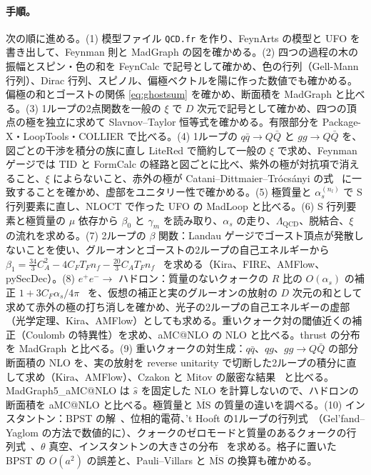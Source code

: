 \documentclass[a4paper,10pt]{ltjsarticle}
\newcommand{\MSbar}{\overline{\mathrm{MS}}}
\begin{document}
\paragraph{手順。}次の順に進める。(1) 模型ファイル \texttt{QCD.fr} を作り、FeynArts の模型と UFO を書き出して、Feynman 則と MadGraph の図を確かめる。(2) 四つの過程の木の振幅とスピン・色の和を FeynCalc で記号として確かめ、色の行列（Gell-Mann 行列）、Dirac 行列、スピノル、偏極ベクトルを陽に作った数値でも確かめる。偏極の和とゴーストの関係 \eqref{eq:ghostsum} を確かめ、断面積を MadGraph と比べる。(3) 1ループの2点関数を一般の $\xi$ で $D$ 次元で記号として確かめ、四つの頂点の極を独立に求めて Slavnov--Taylor 恒等式を確かめる。有限部分を Package-X・LoopTools・COLLIER で比べる。(4) 1ループの $q\bar q\to Q\bar Q$ と $gg\to Q\bar Q$ を、図ごとの干渉を積分の族に直し LiteRed で簡約して一般の $\xi$ で求め、Feynman ゲージでは TID と FormCalc の経路と図ごとに比べ、紫外の極が対抗項で消えること、$\xi$ によらないこと、赤外の極が Catani--Dittmaier--Trócsányi の式~\cite{cdt01} に一致することを確かめ、虚部をユニタリー性で確かめる。(5) 極質量と $\alpha_s^{(n_l)}$ で S 行列要素に直し、NLOCT で作った UFO の MadLoop と比べる。(6) S 行列要素と極質量の $\mu$ 依存から $\beta_0$ と $\gamma_m$ を読み取り、$\alpha_s$ の走り、$\Lambda_{\mathrm{QCD}}$、脱結合、$\xi$ の流れを求める。(7) 2ループの $\beta$ 関数：Landau ゲージでゴースト頂点が発散しないことを使い、グルーオンとゴーストの2ループの自己エネルギーから $\beta_1=\frac{34}3C_A^2-4C_FT_Fn_f-\frac{20}3C_AT_Fn_f$~\cite{caswell74,jones74} を求める（Kira、FIRE、AMFlow、pySecDec）。(8) $e^+e^-\to$ ハドロン：質量のないクォークの $R$ 比の $O(\alpha_s)$ の補正 $1+3C_F\alpha_s/4\pi$~\cite{ds79,ckt79,cg80} を、仮想の補正と実のグルーオンの放射の $D$ 次元の和として求めて赤外の極の打ち消しを確かめ、光子の2ループの自己エネルギーの虚部（光学定理、Kira、AMFlow）としても求める。重いクォーク対の閾値近くの補正（Coulomb の特異性）を求め、aMC@NLO の NLO と比べる。thrust の分布を MadGraph と比べる。(9) 重いクォークの対生成：$q\bar q$、$qg$、$gg\to Q\bar Q$ の部分断面積の NLO を、実の放射を reverse unitarity で切断した2ループの積分に直して求め（Kira、AMFlow）、Czakon と Mitov の厳密な結果~\cite{cm10} と比べる。MadGraph5\_aMC@NLO は $\hat s$ を固定した NLO を計算しないので、ハドロンの断面積を aMC@NLO と比べる。極質量と $\MSbar$ の質量の違いを調べる。(10) インスタントン：BPST の解~\cite{bpst}、位相的電荷、't Hooft の1ループの行列式~\cite{thooft76}（Gel'fand--Yaglom の方法で数値的に）、クォークのゼロモードと質量のあるクォークの行列式~\cite{dhlm05}、$\theta$ 真空、インスタントンの大きさの分布~\cite{bernard79} を求める。格子に置いた BPST の $O(a^2)$ の誤差と、Pauli--Villars と $\MSbar$ の換算も確かめる。
\end{document}

